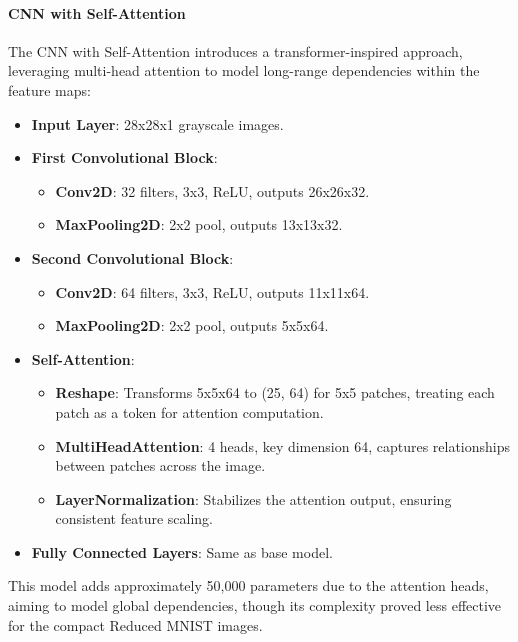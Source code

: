 \documentclass[12pt]{article}
\begin{document}
\paragraph{CNN with Self-Attention}
The CNN with Self-Attention introduces a transformer-inspired approach, leveraging multi-head attention to model long-range dependencies within the feature maps:
\begin{itemize}
    \item \textbf{Input Layer}: 28x28x1 grayscale images.
    \item \textbf{First Convolutional Block}:
        \begin{itemize}
            \item \textbf{Conv2D}: 32 filters, 3x3, ReLU, outputs 26x26x32.
            \item \textbf{MaxPooling2D}: 2x2 pool, outputs 13x13x32.
        \end{itemize}
    \item \textbf{Second Convolutional Block}:
        \begin{itemize}
            \item \textbf{Conv2D}: 64 filters, 3x3, ReLU, outputs 11x11x64.
            \item \textbf{MaxPooling2D}: 2x2 pool, outputs 5x5x64.
        \end{itemize}
    \item \textbf{Self-Attention}:
        \begin{itemize}
            \item \textbf{Reshape}: Transforms 5x5x64 to (25, 64) for 5x5 patches, treating each patch as a token for attention computation.
            \item \textbf{MultiHeadAttention}: 4 heads, key dimension 64, captures relationships between patches across the image.
            \item \textbf{LayerNormalization}: Stabilizes the attention output, ensuring consistent feature scaling.
        \end{itemize}
    \item \textbf{Fully Connected Layers}: Same as base model.
\end{itemize}
This model adds approximately 50,000 parameters due to the attention heads, aiming to model global dependencies, though its complexity proved less effective for the compact Reduced MNIST images.
\end{document}

